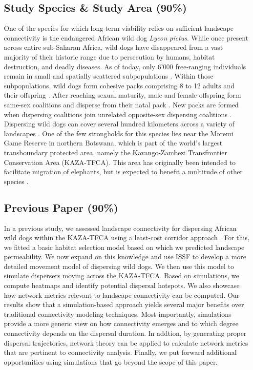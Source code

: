 \documentclass[abstract=on,10pt,a4paper,bibliography=totocnumbered]{article}
\begin{document}
\subsection{Study Species \& Study Area (90\%)}
One of the species for which long-term viability relies on sufficient
landscape connectivity is the endangered African wild dog \textit{Lycon pictus}.
While once present across entire sub-Saharan Africa, wild dogs have disappeared
from a vast majority of their historic range due to persecution by humans,
habitat destruction, and deadly diseases. As of today, only 6'000 free-ranging
individuals remain in small and spatially scattered subpopulations
\citep{Woodroffe.2012}. Within those subpopulations, wild dogs form cohesive
packs comprising 8 to 12 adults and their offspring \cite{McNutt.1995}. After
reaching sexual maturity, male and female offspring form same-sex coalitions and
disperse from their natal pack \citep{McNutt.1996, Behr.2020}. New packs are
formed when dispersing coalitions join unrelated opposite-sex dispersing
coalitions \citep{McNutt.1996}. Dispersing wild dogs can cover several hundred
kilometers across a variety of landscapes \citep{DaviesMostert.2012,
Masenga.2016, Cozzi.2020, Hofmann.2021}. One of the few strongholds for this
species lies near the Moremi Game Reserve in northern Botswana, which is part of
the world's largest transboundary protected area, namely the Kavango-Zambezi
Transfrontier Conservation Area (KAZA-TFCA). This area has originally been
intended to facilitate migration of elephants, but is expected to benefit a
multitude of other species \citep{Elliot.2014, Brennan.2020, Hofmann.2021}.

\subsection{Previous Paper (90\%)}
In a previous study, we assessed landscape connectivity for dispersing African
wild dogs within the KAZA-TFCA using a least-cost corridor approach
\citep{Hofmann.2021}. For this, we fitted a basic habitat selection model based
on which we predicted landscape permeability. We now expand on this knowledge
and use ISSF to develop a more detailed movement model of dispersing wild dogs.
We then use this model to simulate dispersers moving across the KAZA-TFCA. Based
on simulations, we compute heatmaps and identify potential dispersal hotspots.
We also showcase how network metrics relevant to landscape connectivity can be
computed. Our results show that a simulation-based approach yields several major
benefits over traditional connectivity modeling techniques. Most importantly,
simulations provide a more generic view on how connectivity emerges and to which
degree connectivity depends on the dispersal duration. In addtion, by generating
proper dispersal trajectories, network theory can be applied to calculate
network metrics that are pertinent to connectivity analysis. Finally, we put
forward additional opportunities using simulations that go beyond the scope of
this paper.
\end{document}
